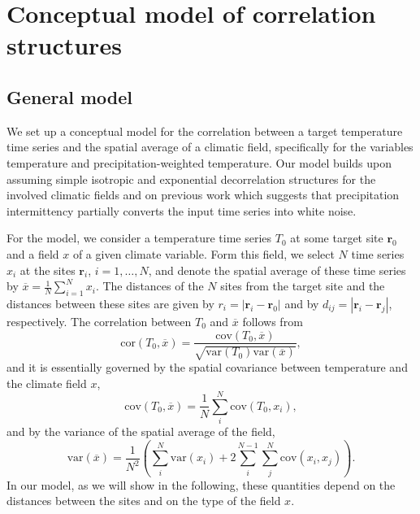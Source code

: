 \documentclass[cp, manuscript]{copernicus}
\begin{document}
\section{Conceptual model of correlation structures}
\label{app:concept.model}

\subsection{General model}
\label{app:concept.model.general}

We set up a conceptual model for the correlation between a target temperature
time series and the spatial average of a climatic field, specifically for the
variables temperature and precipitation-weighted temperature. Our model builds
upon assuming simple isotropic and exponential decorrelation structures for the
involved climatic fields and on previous work which suggests that precipitation
intermittency partially converts the input time series into white noise.

For the model, we consider a temperature time series $T_0$ at some target site
$\mathbf{r}_0$ and a field $x$ of a given climate variable. Form this field, we
select $N$ time series $x_i$ at the sites $\mathbf{r}_i$, $i=1,\dotsc,N$, and
denote the spatial average of these time series by
$\overline{x}=\frac{1}{N}\sum_{i=1}^{N}{x_i}$. The distances of the $N$ sites
from the target site and the distances between these sites are given by
$r_i=|\mathbf{r}_i-\mathbf{r}_0|$ and by $d_{ij}=|{\mathbf{r}_i-\mathbf{r}_j}|$,
respectively. The correlation between $T_0$ and $\overline{x}$ follows from
%
\begin{equation}
\label{eq:corr.general}
\mathrm{cor}(T_0,\overline{x})=\frac
{\mathrm{cov}(T_0,\overline{x})}
{\sqrt{\mathrm{var}(T_0)\mathrm{var}(\overline{x})}},
\end{equation}
and it is essentially governed by the spatial covariance between temperature and
the climate field $x$,
%
\begin{equation}
\label{eq:cov.general}
\mathrm{cov}(T_0,\overline{x})=
\frac{1}{N}\sum_{i}^{N}{\mathrm{cov}(T_0,x_i)},
\end{equation}
%
and by the variance of the spatial average of the field,
\begin{equation}
\label{eq:var.general}
\mathrm{var}(\overline{x})=
\frac{1}{N^2}\left(
\sum_{i}^{N}{\mathrm{var}(x_i)} +
2\sum_{i}^{N-1}\sum_{j}^{N}{\mathrm{cov}(x_i,x_j)}
\right).
\end{equation}
%
In our model, as we will show in the following, these quantities depend on the
distances between the sites and on the type of the field $x$.
\end{document}
